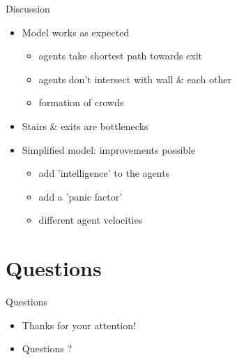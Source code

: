 \begin{frame}{Discussion}
\begin{itemize}
	\item Model works as expected
		\begin{itemize}
			\item agents take shortest path towards exit
			\item agents don't intersect with wall \& each other
			\item formation of crowds
		\end{itemize}
	\item Stairs \& exits are bottlenecks
	\item Simplified model: improvements possible
		\begin{itemize}
			\item add 'intelligence' to the agents
			\item add a 'panic factor'
			\item different agent velocities
		\end{itemize}
\end{itemize}
\end{frame}


\section{Questions}

\begin{frame}{Questions}
	\begin{itemize}
		\item Thanks for your attention!
		\item Questions ?
	\end{itemize}
\end{frame}
